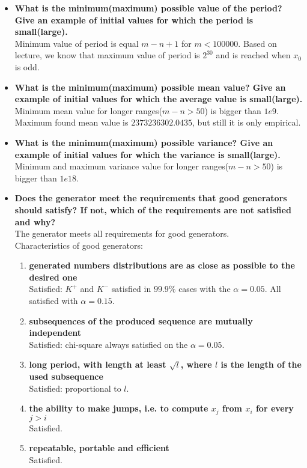 \documentclass[a4paper,10pt]{article}
\begin{document}
\begin{itemize}
 \item \textbf{What is the minimum(maximum) possible value of the period? Give an example of initial values for which the period is small(large).} \\ 
Minimum value of period is equal $m-n + 1$ for $m<100000$.  Based on lecture, we know that maximum value of period is $2^30$ and is reached when $x_0$ is odd.

 \item \textbf{What is the minimum(maximum) possible mean value? Give an example of initial values for which the average value is small(large).} \\
Minimum mean value for longer ranges($m-n>50$) is bigger than $1e9$. Maximum found mean value is $2373236302.0435$, but still it is only empirical.

 \item \textbf{What is the minimum(maximum) possible variance? Give an example of initial values for which the variance is small(large).} \\
Minimum and maximum variance value for longer ranges($m-n>50$) is bigger than $1e18$.

 \item \textbf{Does the generator meet the requirements that good generators should satisfy? If not, which of the requirements are not satisfied and why?} \\
  The generator meets all requirements for good generators. \\
  Characteristics of good generators:
   \begin{enumerate}
    \item \textbf{generated numbers distributions are as close as possible to the desired one} \\
    Satisfied: $K^+$ and $K^-$ satisfied in $99.9\%$ cases with the $\alpha = 0.05$. All satisfied with $\alpha = 0.15$.
    \item \textbf{subsequences of the produced sequence are mutually independent} \\
    Satisfied: chi-square always satisfied on the $\alpha = 0.05$.
    \item \textbf{long period, with length at least $\sqrt{l}$, where $l$ is the length of the used subsequence} \\
    Satisfied: proportional to $l$.
    \item \textbf{the ability to make jumps, i.e. to compute $x_j$ from $x_i$ for every $j > i$} \\
    Satisfied.
    \item \textbf{repeatable, portable and efficient} \\
    Satisfied.
   \end{enumerate}
 

\end{itemize}
\end{document}

